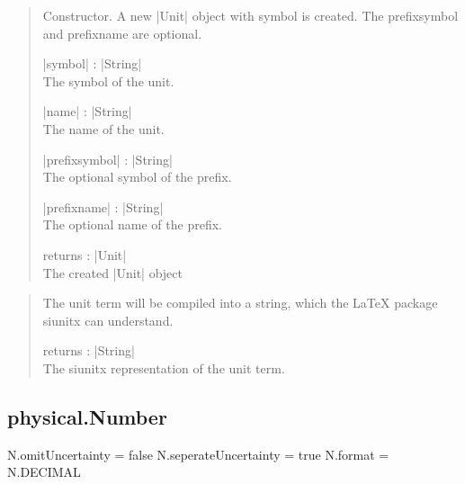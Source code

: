 \documentclass{ltxdoc}
\begin{document}
\begin{quote}
  Constructor. A new |Unit| object with symbol is created. The prefixsymbol and prefixname are optional. 

  \begin{description}
  \item |symbol| : |String|\\
    The symbol of the unit.

  \item |name| : |String|\\
    The name of the unit.

  \item |prefixsymbol| : |String|\\
    The optional symbol of the prefix. 

  \item |prefixname| : |String|\\
    The optional name of the prefix. 

  \item returns : |Unit|\\
    The created |Unit| object
  \end{description}

\end{quote}




\begin{quote}
  The unit term will be compiled into a string, which the LaTeX package siunitx can understand.

  \begin{description}
  \item returns : |String|\\
    The siunitx representation of the unit term.
  \end{description}

\end{quote}





\newpage
\subsection{physical.Number}

\begin{luacode}
N.omitUncertainty = false
N.seperateUncertainty = true
N.format = N.DECIMAL
\end{luacode}
\end{document}
